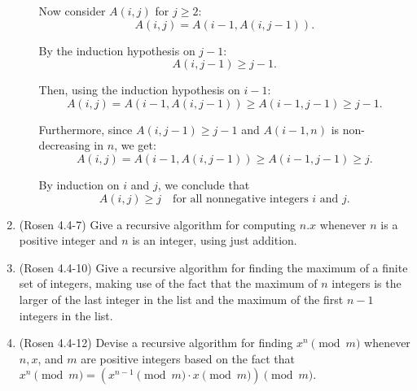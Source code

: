 \begin{enumerate}
\begin{enumerate}
{Now consider $A(i,j)$ for $j \ge 2$:
\[
A(i,j) = A(i-1, A(i,j-1)).
\]

By the induction hypothesis on $j-1$:
\[
A(i,j-1) \ge j-1.
\]

Then, using the induction hypothesis on $i-1$:
\[
A(i,j) = A(i-1, A(i,j-1)) \ge A(i-1, j-1) \ge j-1.
\]

Furthermore, since $A(i,j-1) \ge j-1$ and $A(i-1,n)$ is non-decreasing in $n$, we get:
\[
A(i,j) = A(i-1, A(i,j-1)) \ge A(i-1, j-1) \ge j.
\]

By induction on $i$ and $j$, we conclude that 
\[
A(i,j) \ge j \quad \text{for all nonnegative integers } i \text{ and } j.
\]
}
\end{enumerate}

\item \streasy (Rosen 4.4-7)  Give a recursive algorithm for computing $n.x$ whenever $n$ is a positive integer and $n$ is an integer, using just addition.
\solution{
\[
\text{mult}(n, x) =
\begin{cases}
x, & \text{if } n = 1, \\
x + \text{mult}(n-1, x), & \text{if } n > 1.
\end{cases}
\]

}

\item \streasy (Rosen 4.4-10) Give a recursive algorithm for finding the maximum of a finite set of integers, making use of the fact that the maximum of $n$ integers is the larger of the last integer in the list and the maximum of the first $n - 1$ integers in the list.

\item \streasy (Rosen 4.4-12)  Devise a recursive algorithm for finding $x^n \pmod{m}$ whenever $n, x$, and $m$ are positive integers based on the fact that $x^n \pmod{m}= (x^{n-1} \pmod{m}\cdot x\pmod{m})\pmod{m}$.
\end{enumerate}
